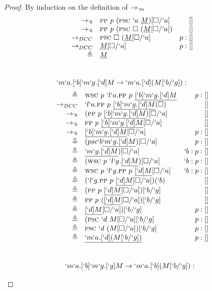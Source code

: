 \begin{proof}{By induction on the definition of $\rightarrow_{`m}$}
\[\begin{array}{rlrl}
   \to_{`b}     & \textsc{pp}\ p\ (\textsc{psc}\ `a\ \underline{M})[\square/`a] & [] \\
   \to_{`b}     & \textsc{pp}\ p\ (\textsc{psc}\ \square\ (\underline{M}[\square/`a]) & [] \\
   \to_{DCC}   & \textsc{psc}\ \square\ (\underline{M}[\square/`a] & p:[] \\
   \to_{DCC}   & \underline{M}[\square/`a] & p:[] \\
   \triangleq & \underline{M} \\
\end{array}
\]
\\ 
\[
\begin{array}{rlrl}
  \prooflabel{`m`a.[`b]`m`g.[`d]M \to `m`a.[`d](M[`b/`g]):} \\
    \triangleq & \wsc\ p\ `l`a.\pp\ p\ \tr{[`b]`m`g.[`d]M} & p:[] \\
    \todcc\    & `l`a.\pp\ p\ \tr{[`b]`m`g.[`d]M}(\square) & [] \\
    \tob\      & (\pp\ p\ \tr{[`b]`m`g.[`d]M})[\square/`a] & [] \\
    \tob\      & \pp\ p\ \tr{[`b]`m`g.[`d]M}[\square/`a] & [] \\
    \tob\      & \tr{[`b]`m`g.[`d]M}[\square/`a] & p:[] \\
    \triangleq & (psc `b \tr{`m`g.[`d]M})[\square/`a] & p:[] \\
    \triangleq & \tr{`m`g.[`d]M})[\square/`a] & `b:p:[] \\
    \triangleq & (\wsc\ p\ `l`g.\tr{[`d]M})[\square/`a] & `b:p:[] \\
    \triangleq & \wsc\ p\ `l`g.\pp\ p\ \tr{[`d]M}[\square/`a] & `b:p:[] \\
    \triangleq & (`l`g.\pp\ p\ \tr{[`d]M}[\square/`a])(`b) & [] \\
    \triangleq & (\pp\ p\ \tr{[`d]M}[\square/`a])[`b/`g] & [] \\
    \triangleq & \pp\ p\ (\tr{[`d]M}[\square/`a])[`b/`g] & [] \\
    \triangleq & \tr{[`d]M}[\square/`a])[`b/`g] & p:[] \\
    \triangleq & (\psc\ `d\ M[\square/`a][`b/`g] & p:[] \\
    \triangleq & \psc\ `d\ (M[\square/`a])[`b/`g] & p:[] \\
    \triangleq & \tr{`m`a.[`d](M[`b/`g])} & p:[] \\
\end{array}
\]
\\ 
\[
\begin{array}{rlrl}
  \prooflabel{`m`a.[`b]`m`g.[`g]M \to `m`a.[`b](M[`b/`g]):} \\

\end{array}\]
\end{proof}
